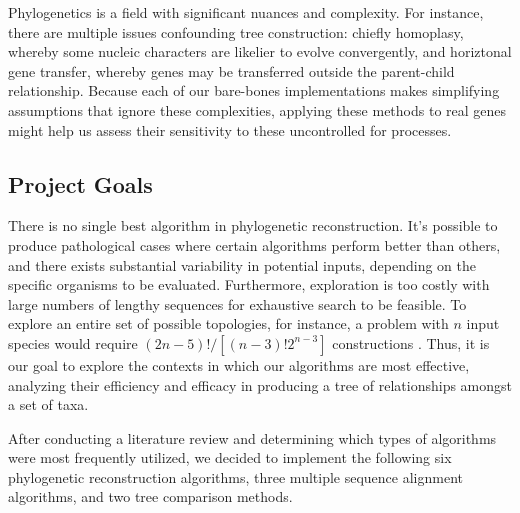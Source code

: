 \documentclass[10pt,twocolumn]{article}
\begin{document}
Phylogenetics is a field with significant nuances and complexity. For instance, there are multiple issues confounding tree construction: chiefly homoplasy, whereby some nucleic characters are likelier to evolve convergently, and horiztonal gene transfer, whereby genes may be transferred outside the parent-child relationship. Because each of our bare-bones implementations makes simplifying assumptions that ignore these complexities, applying these methods to real genes might help us assess their sensitivity to these uncontrolled for processes.

\subsection*{Project Goals}
There is no single best algorithm in phylogenetic reconstruction. It's possible to produce pathological cases where certain algorithms perform better than others, and there exists substantial variability in potential inputs, depending on the specific organisms to be evaluated. Furthermore, exploration is too costly with large numbers of lengthy sequences for exhaustive search to be feasible. To explore an entire set of possible topologies, for instance, a problem with $n$ input species would require $(2n-5)!/[(n-3)! 2^{n-3}]$ constructions \cite{heywood1964phenetic}. Thus, it is our goal to explore the contexts in which our algorithms are most effective, analyzing their efficiency and efficacy in producing a tree of relationships amongst a set of taxa.

After conducting a literature review and determining which types of algorithms were
most frequently utilized, we decided to implement the following six phylogenetic reconstruction
algorithms, three multiple sequence alignment algorithms, and two tree comparison methods.
\end{document}
